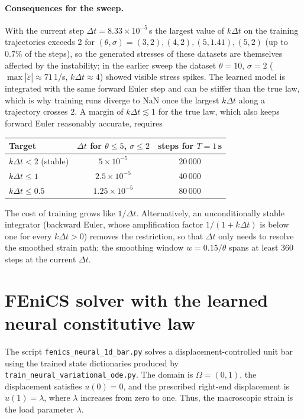 \documentclass[11pt]{article}
\begin{document}
\paragraph{Consequences for the sweep.}
With the current step $\Delta t = 8.33\times10^{-5}$\,s the largest value of
$k\Delta t$ on the training trajectories exceeds 2 for
$(\theta,\sigma)=(3,2),(4,2),(5,1.41),(5,2)$ (up to $0.7\%$ of the steps), so
the generated stresses of these datasets are themselves affected by the
instability; in the earlier sweep the dataset $\theta=10$, $\sigma=2$
($\max|\dot\varepsilon|\approx 71$\,1/s, $k\Delta t\approx 4$) showed
visible stress spikes. The learned model is integrated with the same
forward Euler step and can be stiffer than the true law, which is why
training runs diverge to NaN once the largest $k\Delta t$ along a trajectory
crosses 2. A margin of $k\Delta t\lesssim 1$ for the true law, which also
keeps forward Euler reasonably accurate, requires
\begin{center}
    \begin{tabular}{lcc}
        \toprule
        Target                 & $\Delta t$ for $\theta\le5$, $\sigma\le2$ & steps for $T=1$\,s \\
        \midrule
        $k\Delta t<2$ (stable) & $5\times10^{-5}$                          & 20\,000            \\
        $k\Delta t\le1$        & $2.5\times10^{-5}$                        & 40\,000            \\
        $k\Delta t\le0.5$      & $1.25\times10^{-5}$                       & 80\,000            \\
        \bottomrule
    \end{tabular}
\end{center}
The cost of training grows like $1/\Delta t$. Alternatively, an
unconditionally stable integrator (backward Euler, whose amplification factor
$1/(1+k\Delta t)$ is below one for every $k\Delta t>0$) removes the
restriction, so that $\Delta t$ only needs to resolve the smoothed strain
path; the smoothing window $w=0.15/\theta$ spans at least 360 steps at the
current $\Delta t$.

\appendix
\section{FEniCS solver with the learned neural constitutive law}
\label{a:sec:fenics-neural-bar}
The script \texttt{fenics\_neural\_1d\_bar.py} solves a displacement-controlled
unit bar using the trained state dictionaries produced by
\texttt{train\_neural\_variational\_ode.py}. The domain is
$\Omega=(0,1)$, the displacement satisfies $u(0)=0$, and the prescribed
right-end displacement is $u(1)=\lambda$, where $\lambda$ increases from zero
to one. Thus, the macroscopic strain is the load parameter $\lambda$.
\end{document}
